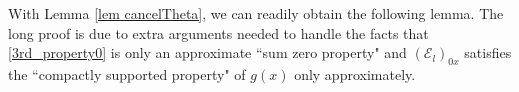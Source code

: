 \documentclass{article}
\newcommand{\1}{\mathds{1}}
\numberwithin{equation}{section}
\newcommand{\be}{\begin{equation}}
\newcommand{\ee}{\end{equation}}
\renewcommand{\leq}{\leqslant}
\renewcommand{\le}{\leq}
\newcommand{\Z}{\mathbb{Z}}
\newcommand{\dashed}{\text{diffusive}}
\DeclareMathOperator{\OO}{O}
\theoremstyle{plain} %
\theoremstyle{remark}
\newcommand{\cob}{\color{purple}}
\newcommand{\Sele}{{\mathcal E}}
\begin{document}
With Lemma \ref{lem cancelTheta}, we can readily obtain the following lemma. The long proof is due to extra arguments needed to handle the facts that \eqref{3rd_property0} is only an approximate ``sum zero property" and $(\Sele_l)_{0x}$ satisfies the ``compactly supported property" of $g(x)$ only approximately. 
\end{document}
